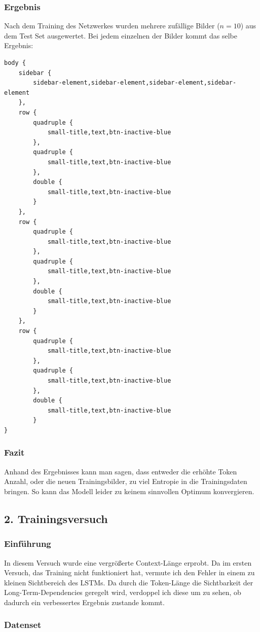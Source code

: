 \documentclass[pdftex,a4paper,halfparskip, article]{scrartcl}
\begin{document}
\subsubsection*{Ergebnis}

Nach dem Training des Netzwerkes wurden mehrere zufällige Bilder ($n=10$) aus dem Test Set ausgewertet. Bei jedem einzelnen der Bilder kommt das selbe Ergebnis:

\begin{verbatim}
body {
	sidebar {
		sidebar-element,sidebar-element,sidebar-element,sidebar-element
	},
	row {
		quadruple {
			small-title,text,btn-inactive-blue
		},
		quadruple {
			small-title,text,btn-inactive-blue
		},
		double {
			small-title,text,btn-inactive-blue
		}
	},
	row {
		quadruple {
			small-title,text,btn-inactive-blue
		},
		quadruple {
			small-title,text,btn-inactive-blue
		},
		double {
			small-title,text,btn-inactive-blue
		}
	},
	row {
		quadruple {
			small-title,text,btn-inactive-blue
		},
		quadruple {
			small-title,text,btn-inactive-blue
		},
		double {
			small-title,text,btn-inactive-blue
		}
}
\end{verbatim}

\subsubsection*{Fazit}

Anhand des Ergebnisses kann man sagen, dass entweder die erhöhte Token Anzahl, oder die neuen Trainingsbilder, zu viel Entropie in die Trainingsdaten bringen. So kann das Modell leider zu keinem sinnvollen Optimum konvergieren. 


\subsection{2. Trainingsversuch}

\subsubsection*{Einführung}

In diesem Versuch wurde eine vergrößerte Context-Länge erprobt. Da im ersten Versuch, das Training nicht funktioniert hat, vermute ich den Fehler in einem zu kleinen Sichtbereich des LSTMs. Da durch die Token-Länge die Sichtbarkeit der Long-Term-Dependencies geregelt wird, verdoppel ich diese um zu sehen, ob dadurch ein verbessertes Ergebnis zustande kommt.

\subsubsection*{Datenset}
\end{document}
